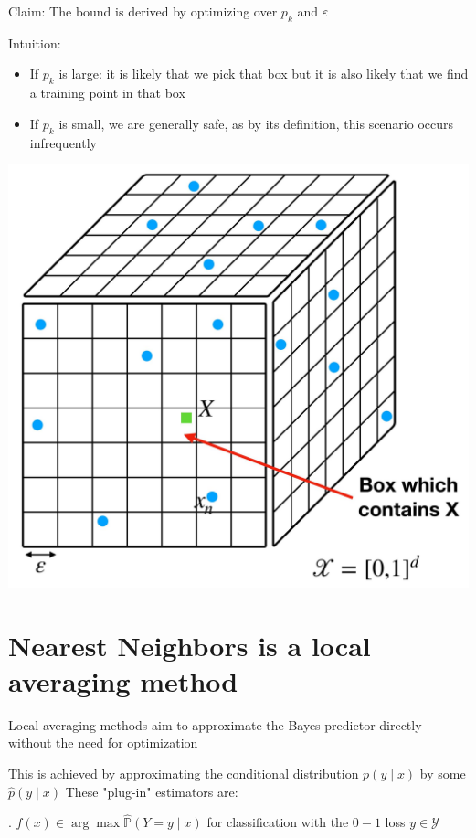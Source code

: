 \documentclass[10pt]{article}
\begin{document}
Claim: The bound is derived by optimizing over $p_{k}$ and $\varepsilon$

Intuition:

\begin{itemize}
  \item If $p_{k}$ is large: it is likely that we pick that box but it is also likely that we find a training point in that box
  \item If $p_{k}$ is small, we are generally safe, as by its definition, this scenario occurs infrequently
\end{itemize}

\begin{center}
\includegraphics[max width=\textwidth]{2023_12_30_f937b0007b5d87b39f79g-39}
\end{center}

\section*{Nearest Neighbors is a local averaging method}
Local averaging methods aim to approximate the Bayes predictor directly - without the need for optimization

This is achieved by approximating the conditional distribution $p(y \mid x)$ by some $\hat{p}(y \mid x)$ These "plug-in" estimators are:

. $f(x) \in \arg \max \hat{\mathbb{P}}(Y=y \mid x)$ for classification with the $0-1$ loss $y \in \mathcal{Y}$
\end{document}
